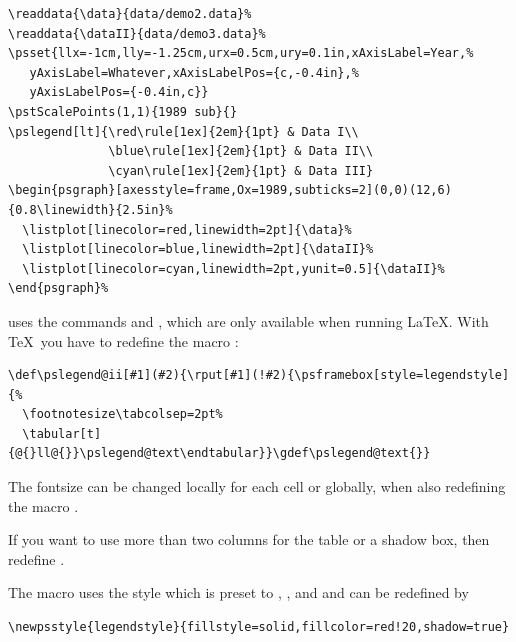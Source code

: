 \documentclass[11pt,english,BCOR=10mm,DIV=12,bibliography=totoc,parskip=false,headings=small,
    headinclude=false,footinclude=false,twoside]{pst-doc}
\begin{document}
\begin{lstlisting}
\readdata{\data}{data/demo2.data}%
\readdata{\dataII}{data/demo3.data}%
\psset{llx=-1cm,lly=-1.25cm,urx=0.5cm,ury=0.1in,xAxisLabel=Year,%
   yAxisLabel=Whatever,xAxisLabelPos={c,-0.4in},%
   yAxisLabelPos={-0.4in,c}}
\pstScalePoints(1,1){1989 sub}{}
\pslegend[lt]{\red\rule[1ex]{2em}{1pt} & Data I\\
              \blue\rule[1ex]{2em}{1pt} & Data II\\
              \cyan\rule[1ex]{2em}{1pt} & Data III}
\begin{psgraph}[axesstyle=frame,Ox=1989,subticks=2](0,0)(12,6){0.8\linewidth}{2.5in}%
  \listplot[linecolor=red,linewidth=2pt]{\data}%
  \listplot[linecolor=blue,linewidth=2pt]{\dataII}%
  \listplot[linecolor=cyan,linewidth=2pt,yunit=0.5]{\dataII}%
\end{psgraph}%
\end{lstlisting}

\begin{compactitem}
\item {} uses the commands  and , which are only available
  when running \LaTeX. With \TeX\ you have to redefine the macro :
\begin{lstlisting}
\def\pslegend@ii[#1](#2){\rput[#1](!#2){\psframebox[style=legendstyle]{%
  \footnotesize\tabcolsep=2pt%
  \tabular[t]{@{}ll@{}}\pslegend@text\endtabular}}\gdef\pslegend@text{}}
\end{lstlisting}
\item The fontsize can be changed locally for each cell or globally, when also redefining the
    macro .
\item If you want to use more than two columns for the table or a shadow box, then redefine .
\end{compactitem}

The macro  uses the style  which is preset to ,
, and  and can be redefined by

\begin{lstlisting}
\newpsstyle{legendstyle}{fillstyle=solid,fillcolor=red!20,shadow=true}
\end{lstlisting}
\end{document}
